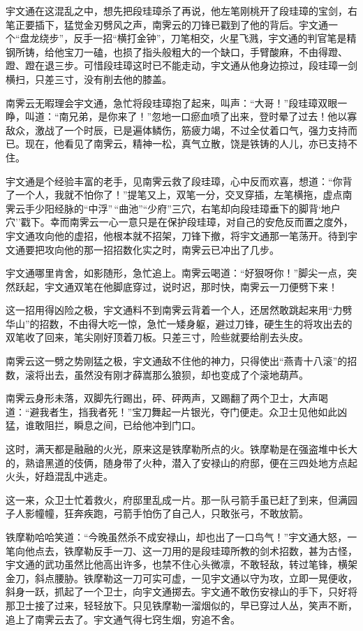 \documentclass[12pt,oneside]{book}
\begin{document}
宇文通在这混乱之中，想先把段珪璋杀了再说，他左笔刚桃开了段珪璋的宝剑，右笔正要插下，猛觉金刃劈风之声，南霁云的刀锋已戳到了他的背后。宇文通一个``盘龙绕步''，反手一招``横打金钟''，刀笔相交，火星飞溅，宇文通的判官笔是精钢所铸，给他宝刀一磕，也损了指头般粗大的一个缺口，手臂酸麻，不由得蹬、蹬、蹬在退三步。可惜段珪璋这时已不能走动，宇文通从他身边掠过，段珪璋一剑横扫，只差三寸，没有削去他的膝盖。

南霁云无暇理会宇文通，急忙将段珪璋抱了起来，叫声：``大哥！''段珪璋双眼一睁，叫道：``南兄弟，是你来了！''忽地一口瘀血喷了出来，登时晕了过去！他以寡敌众，激战了一个时辰，已是遍体鳞伤，筋疲力竭，不过全仗着口气，强力支持而已。现在，他看见了南霁云，精神一松，真气立散，饶是铁铸的人儿，亦已支持不住。

宇文通是个经验丰富的老手，见南霁云救了段珪璋，心中反而欢喜，想道：``你背了一个人，我就不怕你了！''提笔又上，双笔一分，交叉穿插，左笔横拖，虚点南霁云手少阳经脉的``中浮''\,``曲池''``少府''三穴，右笔却向段珪璋垂下的脚背`地户穴''戳下。幸而南霁云一心一意只是在保护段珪璋，对自己的安危反而置之度外，宇文通攻向他的虚招，他根本就不招架，刀锋下撤，将宇文通那一笔荡开。待到宇文通要把攻向他的那一招招数化实之时，南霁云已冲出了几步。

宇文通哪里肯舍，如影随形，急忙追上。南霁云喝道：``好狠呀你！''脚尖一点，突然跃起，宇文通双笔在他脚底穿过，说时迟，那时快，南霁云一刀便劈下来！

这一招用得凶险之极，宇文通料不到南霁云背着一个人，还居然敢跳起来用``力劈华山''的招数，不由得大吃一惊，急忙一矮身躯，避过刀锋，硬生生的将攻出去的双笔收了回来，笔尖刚好顶着刀板。只差三寸，险些就要给削去头皮。

南霁云这一劈之势刚猛之极，宇文通敌不住他的神力，只得使出``燕青十八滚''的招数，滚将出去，虽然没有刚才薛嵩那么狼狈，却也变成了个滚地葫芦。

南霁云身形未落，双脚先行踢出，砰、砰两声，又踢翻了两个卫士，大声喝道：``避我者生，挡我者死！''宝刀舞起一片银光，夺门便走。众卫士见他如此凶猛，谁敢阻拦，瞬息之间，已给他冲到门口。

这时，满天都是融融的火光，原来这是铁摩勒所点的火。铁摩勒是在强盗堆中长大的，熟谙黑道的伎俩，随身带了火种，潜入了安禄山的府邸，便在三四处地方点起火头，好趋混乱中逃走。

这一来，众卫士忙着救火，府邸里乱成一片。那一队弓箭手虽已赶了到来，但满园子人影幢幢，狂奔疾跑，弓箭手怕伤了自己人，只敢张弓，不敢放箭。

铁摩勒哈哈笑道：``今晚虽然杀不成安禄山，却也出了一口鸟气！''宇文通大怒，一笔向他点去，铁摩勒反手一刀、这一刀用的是段珪璋所教的剑术招数，甚为古怪，宇文通的武功虽然比他高出许多，也禁不住心头微凛，不敢轻敌，转过笔锋，横架金刀，斜点腰胁。铁摩勒这一刀可实可虚，一见宇文通以守为攻，立即一晃便收，斜身一跃，抓起了一个卫士，向宇文通掷去。宇文通不敢伤安禄山的手下，只好将那卫士接了过来，轻轻放下。只见铁摩勒一溜烟似的，早已穿过人丛，笑声不断，追上了南霁云去了。宇文通气得七窍生烟，穷追不舍。
\end{document}
